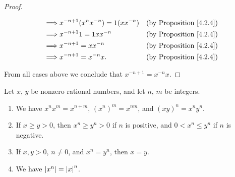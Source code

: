 \begin{proof}
\begin{itemize}
\begin{align*}
                  \implies & x^{-n + 1} (x^n x^{-n}) = 1(x x^{-n}) & \text{(by Proposition \ref{4.2.4})} \\
                  \implies & x^{-n + 1} 1 = 1x x^{-n}              & \text{(by Proposition \ref{4.2.4})} \\
                  \implies & x^{-n + 1} = x x^{-n}                 & \text{(by Proposition \ref{4.2.4})} \\
                  \implies & x^{-n + 1} = x^{-n} x.                & \text{(by Proposition \ref{4.2.4})}
              \end{align*}
    \end{itemize}
    From all cases above we conclude that \(x^{-n + 1} = x^{-n} x\).
\end{proof}

\begin{proposition}\label{4.3.12}
    Let \(x\), \(y\) be nonzero rational numbers, and let \(n\), \(m\) be integers.
    \begin{enumerate}
        \item We have \(x^n x^m = x^{n + m}\), \((x^n)^m = x^{nm}\), and \((xy)^n = x^n y^n\).
        \item If \(x \geq y > 0\), then \(x^n \geq y^n > 0\) if \(n\) is positive, and \(0 < x^n \leq y^n\) if \(n\) is negative.
        \item If \(x, y > 0\), \(n \neq 0\), and \(x^n = y^n\), then \(x = y\).
        \item We have \(\left\lvert x^n\right\rvert = \left\lvert x\right\rvert^n\).
    \end{enumerate}
\end{proposition}

